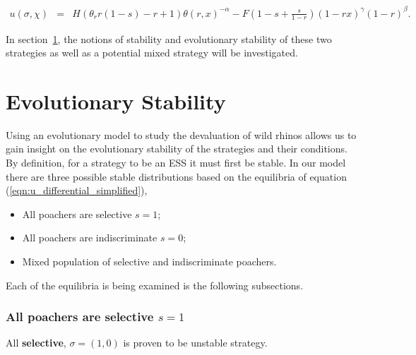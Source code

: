 \documentclass[10pt]{article}
\begin{document}
\begin{eqnarray}
\label{eqn:tutility2}
u(\sigma, \chi) &=&
H (\theta_r r(1-s) - r + 1)\theta(r,x)^{-\alpha} - F\left(1-s + \frac{s}{1-r} \right)(1-rx)^{\gamma}(1-r)^{\beta} .
\end{eqnarray}

In section~\ref{section:evolutionary_stability}, the notions of stability
and evolutionary stability of these two strategies as well as a potential 
mixed strategy will be investigated.

\section{Evolutionary Stability}\label{section:evolutionary_stability}

Using an evolutionary model to study the devaluation of wild rhinos allows us 
to gain insight on the evolutionary stability of the strategies and their conditions.
By definition, for a strategy to be an ESS it must first be stable.
In our model there are three possible stable distributions based on the
equilibria of equation (\ref{eqn:u_differential_simplified}),

\begin{itemize} 
	\item All poachers are selective \(s=1\);
	\item All poachers are indiscriminate \(s=0\);
	\item Mixed population of selective and indiscriminate poachers.
\end{itemize}

Each of the equilibria is being examined is the following subsections.

\subsubsection{All poachers are selective \(s=1\)}

All \textbf{selective}, \(\sigma=(1, 0)\) is proven to be unstable strategy.
\end{document}
